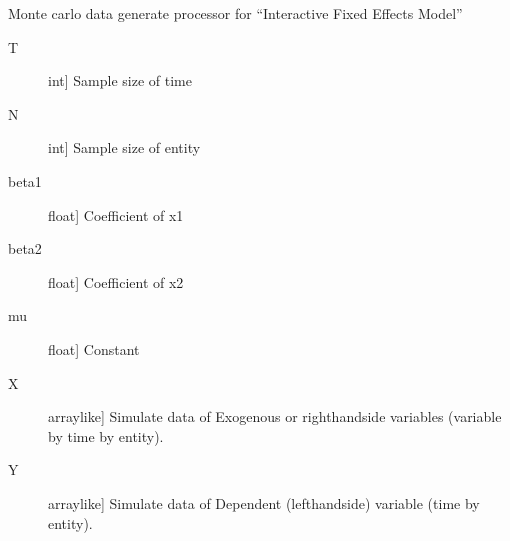 \documentclass[a4paper,11pt,english]{sphinxmanual}
\begin{document}
\begin{fulllineitems}
\label{\detokenize{analysis:src.analysis.monte_carlo_dgp.dgp_interactive_fixed_effects_model_no_iid}}
\sphinxAtStartPar
Monte carlo data generate processor for “Interactive Fixed Effects Model”
\begin{description}
\item[{T}] \leavevmode{[}int{]}
\sphinxAtStartPar
Sample size of time

\item[{N}] \leavevmode{[}int{]}
\sphinxAtStartPar
Sample size of entity

\item[{beta1}] \leavevmode{[}float{]}
\sphinxAtStartPar
Coefficient of x1

\item[{beta2}] \leavevmode{[}float{]}
\sphinxAtStartPar
Coefficient of x2

\item[{mu}] \leavevmode{[}float{]}
\sphinxAtStartPar
Constant

\end{description}
\begin{description}
\item[{X}] \leavevmode{[}array\sphinxhyphen{}like{]}
\sphinxAtStartPar
Simulate data of Exogenous or right\sphinxhyphen{}hand\sphinxhyphen{}side variables (variable by time by
entity).

\item[{Y}] \leavevmode{[}array\sphinxhyphen{}like{]}
\sphinxAtStartPar
Simulate data of Dependent (left\sphinxhyphen{}hand\sphinxhyphen{}side) variable (time by entity).


\end{description}
\end{fulllineitems}
\end{document}
